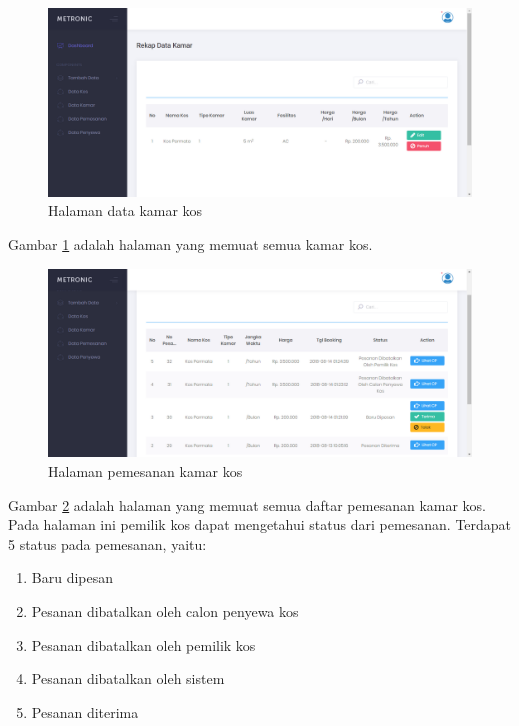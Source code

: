 \begin{enumerate}[a.]
		\begin{figure}[H]
			\centering
			\includegraphics[width=\textwidth]{gambar/web/10}
			\caption{Halaman data kamar kos}
			\label{web10}
		\end{figure}
	
		Gambar \ref{web10} adalah halaman yang memuat semua kamar kos.
		
		\begin{figure}[H]
			\centering
			\includegraphics[width=\textwidth]{gambar/web/12}
			\caption{Halaman pemesanan kamar kos}
			\label{web12}
		\end{figure}
	
		Gambar \ref{web12} adalah halaman yang memuat semua daftar pemesanan kamar kos. Pada halaman ini pemilik kos dapat mengetahui status dari pemesanan. Terdapat 5 status pada pemesanan, yaitu:
		
		\begin{enumerate}[-]
			\item Baru dipesan
			\item Pesanan dibatalkan oleh calon penyewa kos
			\item Pesanan dibatalkan oleh pemilik kos
			\item Pesanan dibatalkan oleh sistem
			\item Pesanan diterima
		\end{enumerate}
	

\end{enumerate}
